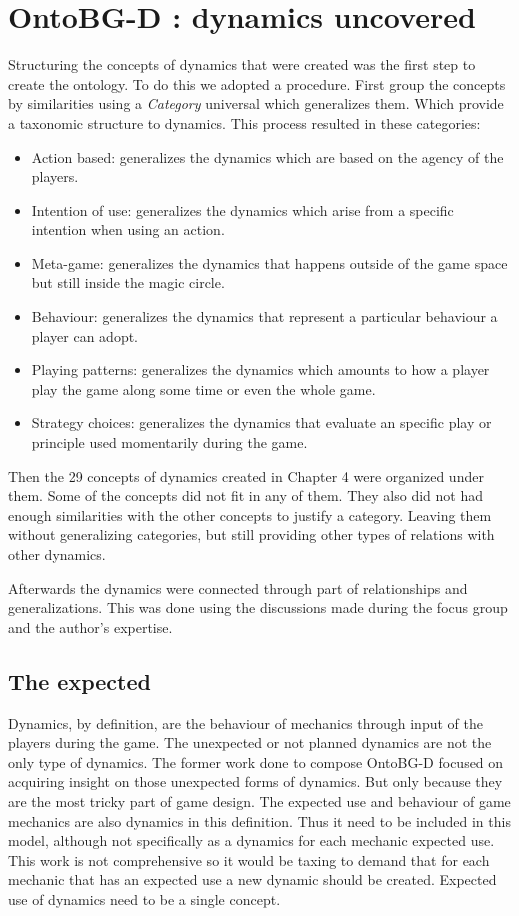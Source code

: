 \section{OntoBG-D : dynamics uncovered}

Structuring the concepts of dynamics that were created was the first step to create the ontology. To do this we adopted a procedure. First group the concepts by similarities using a \textit{Category} universal which generalizes them. Which provide a taxonomic structure to dynamics. This process resulted in these categories:
\begin{itemize}
    \item Action based: generalizes the dynamics which are based on the agency of the players.
    \item Intention of use: generalizes the dynamics which arise from a specific intention when using an action.
    \item Meta-game: generalizes the dynamics that happens outside of the game space but still inside the magic circle.
    \item Behaviour: generalizes the dynamics that represent a particular behaviour a player can adopt.
    \item Playing patterns: generalizes the dynamics which amounts to how a player play the game along some time or even the whole game.
    \item Strategy choices: generalizes the dynamics that evaluate an specific play or principle used momentarily during the game.
\end{itemize}

Then the 29 concepts of dynamics created in Chapter 4 were organized under them. Some of the concepts did not fit in any of them. They also did not had enough similarities with the other concepts to justify a category. Leaving them without generalizing categories, but still providing other types of relations with other dynamics.

Afterwards the dynamics were connected through part of relationships and generalizations. This was done using the discussions made during the focus group and the author's expertise. 

\subsection{The expected}

Dynamics, by definition, are the behaviour of mechanics through input of the players during the game. The unexpected or not planned dynamics are not the only type of dynamics. The former work done to compose OntoBG-D focused on acquiring insight on those unexpected forms of dynamics. But only because they are the most tricky part of game design. The expected use and behaviour of game mechanics are also dynamics in this definition. Thus it need to be included in this model, although not specifically as a dynamics for each mechanic expected use. This work is not comprehensive so it would be taxing to demand that for each mechanic that has an expected use a new dynamic should be created. Expected use of dynamics need to be a single concept.

